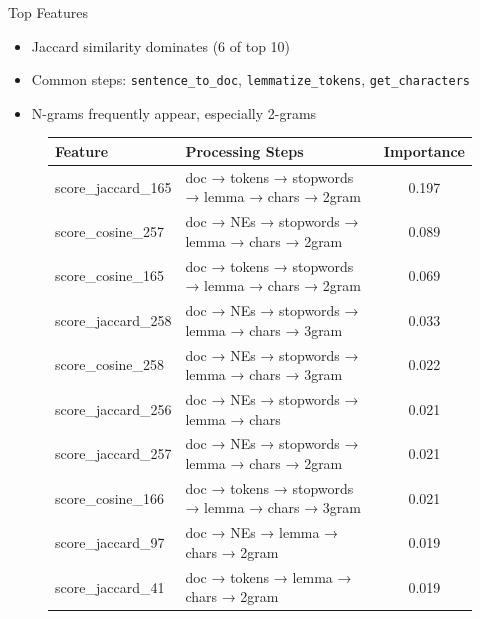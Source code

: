 \documentclass{beamer}
\begin{document}
\begin{frame}{Top Features}
    \begin{itemize}
        \item Jaccard similarity dominates (6 of top 10)
        \item Common steps: \texttt{sentence\_to\_doc}, \texttt{lemmatize\_tokens}, \texttt{get\_characters}
        \item N-grams frequently appear, especially 2-grams
    \end{itemize}
    \begin{figure}[h]
        \centering
        \begin{tabular}{|l|l|c|}
            \hline
            \tiny{\textbf{Feature}} & \tiny{\textbf{Processing Steps}} & \tiny{\textbf{Importance}} \\
            \hline
            \tiny{score\_jaccard\_165} & \tiny{doc → tokens → stopwords → lemma → chars → 2gram} & \tiny{0.197} \\
            \tiny{score\_cosine\_257} & \tiny{doc → NEs → stopwords → lemma → chars → 2gram} & \tiny{0.089} \\
            \tiny{score\_cosine\_165} & \tiny{doc → tokens → stopwords → lemma → chars → 2gram} & \tiny{0.069} \\
            \tiny{score\_jaccard\_258} & \tiny{doc → NEs → stopwords → lemma → chars → 3gram} & \tiny{0.033} \\
            \tiny{score\_cosine\_258} & \tiny{doc → NEs → stopwords → lemma → chars → 3gram} & \tiny{0.022} \\
            \tiny{score\_jaccard\_256} & \tiny{doc → NEs → stopwords → lemma → chars} & \tiny{0.021} \\
            \tiny{score\_jaccard\_257} & \tiny{doc → NEs → stopwords → lemma → chars → 2gram} & \tiny{0.021} \\
            \tiny{score\_cosine\_166} & \tiny{doc → tokens → stopwords → lemma → chars → 3gram} & \tiny{0.021} \\
            \tiny{score\_jaccard\_97} & \tiny{doc → NEs → lemma → chars → 2gram} & \tiny{0.019} \\
            \tiny{score\_jaccard\_41} & \tiny{doc → tokens → lemma → chars → 2gram} & \tiny{0.019} \\
            \hline
        \end{tabular}
    \end{figure}
\end{frame}
\end{document}
